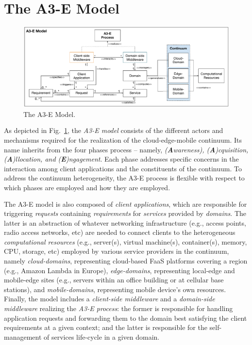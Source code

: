 \section{The A3-E Model}\label{sec:proposal}

\begin{figure}[tbp]
	\includegraphics[width=1\textwidth]{figs/A3-E-model.pdf}
	\caption{The A3-E Model.}
	\label{fig:A3-E-model}
\end{figure}

As depicted in Fig.~\ref{fig:A3-E-model}, the \textit{A3-E model} consists of the different actors and mechanisms required for the realization of the cloud-edge-mobile continuum. Its name inherits from the four phases process -- namely, \textit{(\textbf{A}wareness), (\textbf{A})cquisition, (\textbf{A})llocation, and (\textbf{E})ngagement}. Each phase addresses specific concerns in the interaction among client applications and the constituents of the continuum. To address the continuum heterogeneity, the A3-E process is flexible with respect to which phases are employed and how they are employed.

The A3-E model is also composed of \textit{client applications}, which are responsible for triggering \textit{requests} containing \textit{requirements} for  \textit{services} provided by \textit{domains}. The latter is an abstraction of whatever networking infrastructure (e.g., access points, radio access networks, etc) are needed to connect clients to the heterogeneous \textit{computational resources} (e.g., server(s), virtual machine(s), container(s), memory, CPU, storage, etc) employed by various service providers in the continuum, namely \textit{cloud-domains}, representing cloud-based FaaS platforms covering a region (e.g., Amazon Lambda in Europe), \textit{edge-domains}, representing local-edge and mobile-edge sites (e.g., servers within an office building or at cellular base stations), and \textit{mobile-domains}, representing mobile device's own resources.
Finally, the model includes a \textit{client-side middleware} and a \textit{domain-side middleware} realizing the \textit{A3-E process}: the former is responsible for handling application requests and forwarding them to the domain best satisfying the client requirements at a given context; and the latter is responsible for the self-management of services life-cycle in a given domain. 


